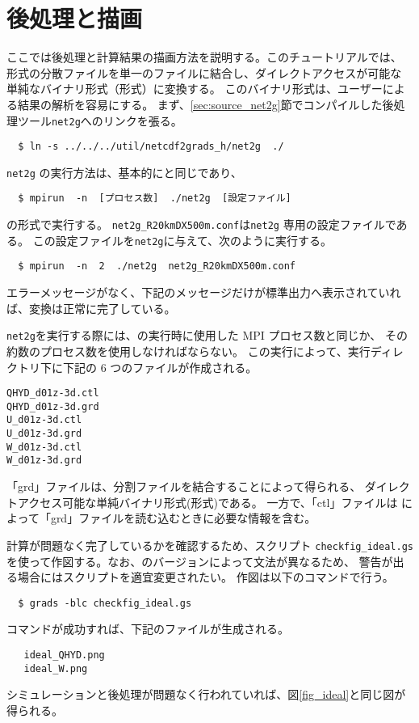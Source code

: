 \section{後処理と描画} \label{sec:ideal_exp_net2g}
ここでは後処理と計算結果の描画方法を説明する。このチュートリアルでは、
{\netcdf}形式の分散ファイルを単一のファイルに結合し、ダイレクトアクセスが可能な
単純なバイナリ形式（\grads 形式）に変換する。
このバイナリ形式は、ユーザーによる結果の解析を容易にする。
まず、\ref{sec:source_net2g}節でコンパイルした後処理ツール\verb|net2g|へのリンクを張る。
\begin{verbatim}
  $ ln -s ../../../util/netcdf2grads_h/net2g  ./
\end{verbatim}

\verb|net2g| の実行方法は、基本的に{\scalerm}と同じであり、
\begin{verbatim}
  $ mpirun  -n  [プロセス数]  ./net2g  [設定ファイル]
\end{verbatim}
の形式で実行する。
\verb|net2g_R20kmDX500m.conf|は\verb|net2g| 専用の設定ファイルである。
この設定ファイルを\verb|net2g|に与えて、次のように実行する。
\begin{verbatim}
  $ mpirun  -n  2  ./net2g  net2g_R20kmDX500m.conf
\end{verbatim}
エラーメッセージがなく、下記のメッセージだけが標準出力へ表示されていれば、変換は正常に完了している。

\verb|net2g|を実行する際には、{\scalerm}の実行時に使用した MPI プロセス数と同じか、
その約数のプロセス数を使用しなければならない。
この実行によって、実行ディレクトリ下に下記の 6 つのファイルが作成される。
\begin{alltt}
  QHYD_d01z-3d.ctl
  QHYD_d01z-3d.grd
  U_d01z-3d.ctl
  U_d01z-3d.grd
  W_d01z-3d.ctl
  W_d01z-3d.grd
\end{alltt}
「grd」ファイルは、分割ファイルを結合することによって得られる、
ダイレクトアクセス可能な単純バイナリ形式(\grads 形式)である。
一方で、「ctl」ファイルは \grads によって「grd」ファイルを読む込むときに必要な情報を含む。

計算が問題なく完了しているかを確認するため、\grads スクリプト \verb|checkfig_ideal.gs|
を使って作図する。なお、\grads のバージョンによって文法が異なるため、
警告が出る場合には\grads スクリプトを適宜変更されたい。
作図は以下のコマンドで行う。
\begin{verbatim}
  $ grads -blc checkfig_ideal.gs
\end{verbatim}
コマンドが成功すれば、下記のファイルが生成される。
\begin{verbatim}
   ideal_QHYD.png
   ideal_W.png
\end{verbatim}
シミュレーションと後処理が問題なく行われていれば、図\ref{fig_ideal}と同じ図が得られる。

